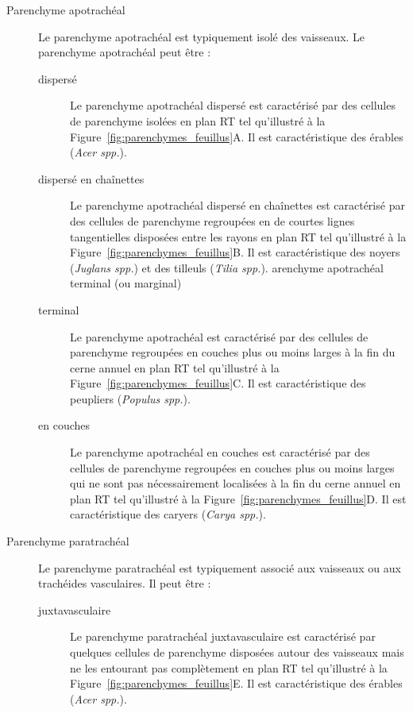 \begin{description}

\item[Parenchyme apotrachéal] Le parenchyme apotrachéal est typiquement isolé des vaisseaux. Le parenchyme apotrachéal peut être :

\begin{description}
	\item[dispersé] Le parenchyme apotrachéal dispersé est caractérisé par des cellules de parenchyme isolées en plan RT tel qu'illustré à la Figure~\ref{fig:parenchymes_feuillus}A.  Il est caractéristique des érables (\textit{Acer spp.}).
	
	\item[dispersé en chaînettes] Le parenchyme apotrachéal dispersé en chaînettes est caractérisé par des cellules de parenchyme regroupées en de courtes lignes tangentielles disposées entre les rayons en plan RT tel qu'illustré à la Figure~\ref{fig:parenchymes_feuillus}B.  Il est caractéristique des noyers (\textit{Juglans spp.}) et des tilleuls (\textit{Tilia spp.}).
	arenchyme apotrachéal terminal (ou marginal)

	\item[terminal] Le parenchyme apotrachéal est caractérisé par des cellules de parenchyme regroupées en couches plus ou moins larges à la fin du cerne annuel en plan RT tel qu’illustré à la Figure~\ref{fig:parenchymes_feuillus}C. Il est caractéristique des peupliers (\textit{Populus spp.}).
	
	\item[en couches] Le parenchyme apotrachéal en couches est caractérisé par des cellules de parenchyme regroupées en couches plus ou moins larges qui ne sont pas nécessairement localisées à la fin du cerne annuel en plan RT tel qu'illustré à la Figure~\ref{fig:parenchymes_feuillus}D. Il est caractéristique des caryers (\textit{Carya spp.}).
\end{description}

\item[Parenchyme paratrachéal] Le parenchyme paratrachéal est typiquement associé aux vaisseaux ou aux trachéides vasculaires. Il peut être :

\begin{description}
	\item[juxtavasculaire] Le parenchyme paratrachéal juxtavasculaire est caractérisé par quelques cellules de parenchyme disposées autour des vaisseaux mais ne les entourant pas complètement en plan RT tel qu'illustré à la Figure~\ref{fig:parenchymes_feuillus}E.  Il est caractéristique des érables (\textit{Acer spp.}).
	

\end{description}
\end{description}
